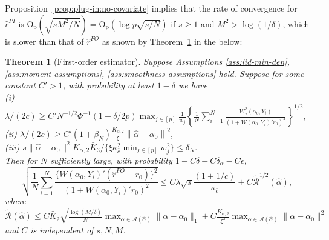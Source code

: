 \documentclass[11pt]{article}
\newtheorem{theorem}{Theorem}
\newcommand{\norm}[1]{\left\lVert #1 \right\rVert}
\begin{document}
Proposition~\ref{prop:plug-in:no-covariate} implies that the rate of convergence for $\hat{r}^{PI}$ is $\mathrm{O}_{\mathrm{p}}(\sqrt{sM^2/N})=\mathrm{O}_{\mathrm{p}}(\log p\sqrt{s/N})$ if $s\geq1$ and $M^2>\log(1/\delta)$, which is slower than that of $\hat{r}^{FO}$ as shown by Theorem~\ref{thm:main:FO} in the below:
\begin{theorem}[First-order estimator]\label{thm:main:FO}
Suppose Assumptions \ref{ass:iid-min-den}, \ref{ass:moment-assumptions}, \ref{ass:smoothness-assumptions} hold. Suppose for some constant $C'>1$, with probability at least $1-\delta$ we have\\
(i) $\lambda/(2c) \geq C'N^{-1/2} \Phi^{-1}(1-\delta/2p)\max_{j\in[p]} \frac{1}{w_j}\left\{\frac{1}{N}\sum_{i=1}^N \frac{W_j^2(\alpha_0,Y_i)}{(1+W(\alpha_0,Y_i)'r_0)^2}\right\}^{1/2}$, \\
(ii) $\lambda/(2c) \geq C'(1+\beta_N)\frac{K_{\alpha,2}}{\xi}\norm{\hat{\alpha}-\alpha_0}^2$,\\
(iii) $s\|\hat\alpha-\alpha_0\|^2 K_{\alpha,2} \bar K_3 / \{\xi\kappa_{\bar c}^2 {\displaystyle \min_{j\in[p]}} w_j^2\}\leq \delta_N$. \\
Then for $N$ sufficiently large, with probability $1- C\delta - C\delta_\alpha-C\epsilon$, $$\displaystyle\sqrt{\frac{1}{N}\sum_{i=1}^N \frac{\{W(\alpha_0,Y_i)'(\hat r^{FO} - r_0 )\}^2}{(1+W(\alpha_0,Y_i)'r_0)^2}}\leq C\lambda\sqrt{s}\frac{(1+1/c)}{\kappa_{\bar{c}}}+C\widetilde{\mathcal{R}}^{1/2}(\hat\alpha),$$ 
where $\widetilde{\mathcal{R}}(\hat\alpha) \leq C\bar{K}_2\sqrt{\frac{\log (M/\delta)}{N}}{\displaystyle\max_{\alpha \in \mathcal{A}(\hat\alpha)}}\|\alpha-\alpha_0\|_1  + C\frac{K_{\alpha,2}}{\xi^2}{\displaystyle\max_{\alpha \in \mathcal{A}(\hat\alpha)}}\|\alpha - \alpha_0\|^2$ and $C$ is independent of $s,N,M$.
\end{theorem}
\end{document}
